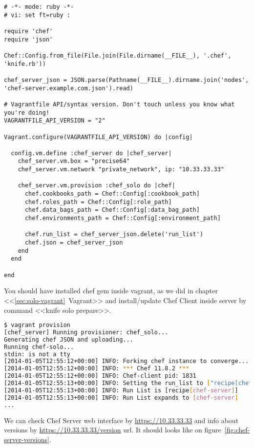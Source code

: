 \begin{lstlisting}[label=lst:my-server-cloud-installation6,title=my-server-cloud/Vagrantfile]
# -*- mode: ruby -*-
# vi: set ft=ruby :

require 'chef'
require 'json'

Chef::Config.from_file(File.join(File.dirname(__FILE__), '.chef', 'knife.rb'))

chef_server_json = JSON.parse(Pathname(__FILE__).dirname.join('nodes', 'chef-server.example.com.json').read)

# Vagrantfile API/syntax version. Don't touch unless you know what you're doing!
VAGRANTFILE_API_VERSION = "2"

Vagrant.configure(VAGRANTFILE_API_VERSION) do |config|

  config.vm.define :chef_server do |chef_server|
    chef_server.vm.box = "precise64"
    chef_server.vm.network "private_network", ip: "10.33.33.33"

    chef_server.vm.provision :chef_solo do |chef|
      chef.cookbooks_path = Chef::Config[:cookbook_path]
      chef.roles_path = Chef::Config[:role_path]
      chef.data_bags_path = Chef::Config[:data_bag_path]
      chef.environments_path = Chef::Config[:environment_path]

      chef.run_list = chef_server_json.delete('run_list')
      chef.json = chef_server_json
    end
  end

end
\end{lstlisting}

You should have installed chef gem inside vagrant, as we did in chapter <<\ref{sec:solo-vagrant}~Vagrant>> and install/update Chef Client inside server by command <<knife solo prepare>>.

\begin{lstlisting}[language=Bash,label=lst:my-server-cloud-installation7]
$ vagrant provision
[chef_server] Running provisioner: chef_solo...
Generating chef JSON and uploading...
Running chef-solo...
stdin: is not a tty
[2014-01-05T12:55:12+00:00] INFO: Forking chef instance to converge...
[2014-01-05T12:55:12+00:00] INFO: *** Chef 11.8.2 ***
[2014-01-05T12:55:12+00:00] INFO: Chef-client pid: 1831
[2014-01-05T12:55:13+00:00] INFO: Setting the run_list to ["recipe[chef-server]"] from JSON
[2014-01-05T12:55:13+00:00] INFO: Run List is [recipe[chef-server]]
[2014-01-05T12:55:13+00:00] INFO: Run List expands to [chef-server]
...
\end{lstlisting}

We can check Chef Server web interface by \href{https://10.33.33.33}{https://10.33.33.33} and info about versions by \href{https://10.33.33.33/version}{https://10.33.33.33/version} url. It should looks like on figure~\ref{fig:chef-server-versions}.

